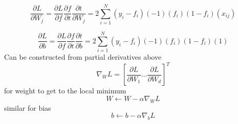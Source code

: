 \documentclass[12pt]{article}
\begin{document}
\begin{equation}
\frac{\partial{L}}{\partial{W_j}} = \frac{\partial{L}}{\partial{f}}\frac{\partial{f}}{\partial{t}}\frac{\partial{t}}{\partial{W_j}} = 2\sum_{i=1}^N (y_i - f_i)(-1)(f_i)(1-f_i)(x_{ij})
\end{equation}

\begin{equation}
\frac{\partial{L}}{\partial{b}} = \frac{\partial{L}}{\partial{f}}\frac{\partial{f}}{\partial{t}}\frac{\partial{t}}{\partial{b}} = 2\sum_{i=1}^N (y_i - f_i)(-1)(f_i)(1-f_i)(1)
\end{equation}
Can be constructed from partial derivatives above
\begin{equation}
\nabla_WL = [\frac{\partial{L}}{\partial{W_1}} \dots \frac{\partial{L}}{\partial{W_d}}]^T
\end{equation}
for weight to get to the local minimum
\begin{equation}
W \leftarrow W - \alpha \nabla_W L
\end{equation}
similar for bias 
\begin{equation}
b \leftarrow b - \alpha \nabla_b L
\end{equation}
\end{document}
